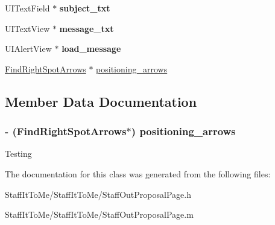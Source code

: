 \begin{DoxyCompactItemize}
\item 
\hypertarget{interface_staff_out_proposal_page_a459e8d8d1442e0b17186c7c2a091b8c4}{
\-U\-I\-Text\-Field $\ast$ {\bfseries subject\-\_\-txt}}
\label{interface_staff_out_proposal_page_a459e8d8d1442e0b17186c7c2a091b8c4}

\item 
\hypertarget{interface_staff_out_proposal_page_a2b75f489e72e0dfed55aaa5abb3566b2}{
\-U\-I\-Text\-View $\ast$ {\bfseries message\-\_\-txt}}
\label{interface_staff_out_proposal_page_a2b75f489e72e0dfed55aaa5abb3566b2}

\item 
\hypertarget{interface_staff_out_proposal_page_a2ba63612c52b15805ec0589aa9173ea9}{
\-U\-I\-Alert\-View $\ast$ {\bfseries load\-\_\-message}}
\label{interface_staff_out_proposal_page_a2ba63612c52b15805ec0589aa9173ea9}

\item 
\hyperlink{interface_find_right_spot_arrows}{\-Find\-Right\-Spot\-Arrows} $\ast$ \hyperlink{interface_staff_out_proposal_page_a0b916d0bf646afb4a5e71f6742c5af28}{positioning\-\_\-arrows}
\end{DoxyCompactItemize}


\subsection{\-Member \-Data \-Documentation}
\hypertarget{interface_staff_out_proposal_page_a0b916d0bf646afb4a5e71f6742c5af28}{
\subsubsection[{positioning\-\_\-arrows}]{\setlength{\rightskip}{0pt plus 5cm}-\/ ({\bf \-Find\-Right\-Spot\-Arrows}$\ast$) {\bf positioning\-\_\-arrows}}}
\label{interface_staff_out_proposal_page_a0b916d0bf646afb4a5e71f6742c5af28}
\-Testing 

\-The documentation for this class was generated from the following files\-:\begin{DoxyCompactItemize}
\item 
\-Staff\-It\-To\-Me/\-Staff\-It\-To\-Me/\-Staff\-Out\-Proposal\-Page.\-h\item 
\-Staff\-It\-To\-Me/\-Staff\-It\-To\-Me/\-Staff\-Out\-Proposal\-Page.\-m\end{DoxyCompactItemize}
